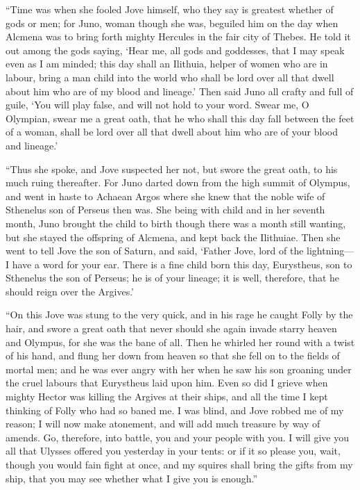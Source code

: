 “Time was when she fooled Jove himself, who they say is greatest whether
of gods or men; for Juno, woman though she was, beguiled him on the day
when Alcmena was to bring forth mighty Hercules in the fair city of
Thebes. He told it out among the gods saying, ‘Hear me, all gods and
goddesses, that I may speak even as I am minded; this day shall an
Ilithuia, helper of women who are in labour, bring a man child into the
world who shall be lord over all that dwell about him who are of my blood
and lineage.’ Then said Juno all crafty and full of guile, ‘You will play
false, and will not hold to your word. Swear me, O Olympian, swear me a
great oath, that he who shall this day fall between the feet of a woman,
shall be lord over all that dwell about him who are of your blood and
lineage.’

“Thus she spoke, and Jove suspected her not, but swore the great oath, to
his much ruing thereafter. For Juno darted down from the high summit of
Olympus, and went in haste to Achaean Argos where she knew that the noble
wife of Sthenelus son of Perseus then was. She being with child and in her
seventh month, Juno brought the child to birth though there was a month
still wanting, but she stayed the offspring of Alcmena, and kept back the
Ilithuiae. Then she went to tell Jove the son of Saturn, and said, ‘Father
Jove, lord of the lightning—I have a word for your ear. There is a
fine child born this day, Eurystheus, son to Sthenelus the son of Perseus;
he is of your lineage; it is well, therefore, that he should reign over
the Argives.’

“On this Jove was stung to the very quick, and in his rage he caught Folly
by the hair, and swore a great oath that never should she again invade
starry heaven and Olympus, for she was the bane of all. Then he whirled
her round with a twist of his hand, and flung her down from heaven so that
she fell on to the fields of mortal men; and he was ever angry with her
when he saw his son groaning under the cruel labours that Eurystheus laid
upon him. Even so did I grieve when mighty Hector was killing the Argives
at their ships, and all the time I kept thinking of Folly who had so baned
me. I was blind, and Jove robbed me of my reason; I will now make
atonement, and will add much treasure by way of amends. Go, therefore,
into battle, you and your people with you. I will give you all that
Ulysses offered you yesterday in your tents: or if it so please you, wait,
though you would fain fight at once, and my squires shall bring the gifts
from my ship, that you may see whether what I give you is enough.”


